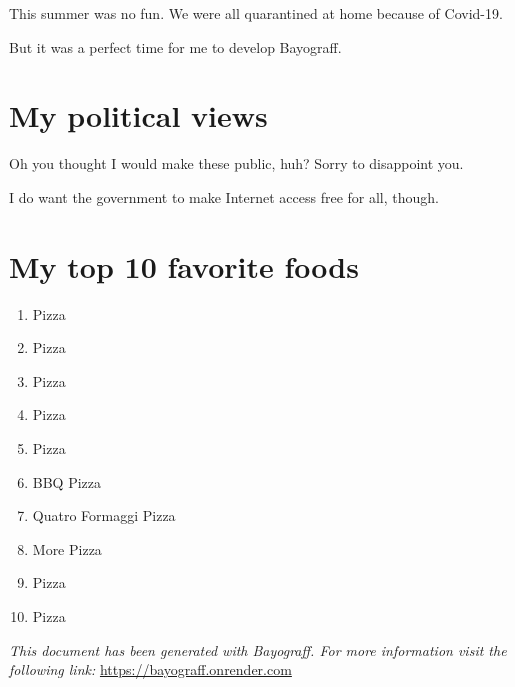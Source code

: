 \documentclass[12pt, a4paper]{article}
\begin{document}
This summer was no fun. We were all quarantined at home because of Covid-19.

But it was a perfect time for me to develop Bayograff.

\appendix

\section{My political views}

Oh you thought I would make these public, huh? Sorry to disappoint you.

I do want the government to make Internet access free for all, though.

\section{My top 10 favorite foods}

\begin{enumerate}
\item Pizza

\item Pizza

\item Pizza

\item Pizza

\item Pizza

\item BBQ Pizza

\item Quatro Formaggi Pizza

\item More Pizza

\item Pizza

\item Pizza

\end{enumerate}

\newpage
\textit{This document has been generated with Bayograff. For more information visit the following link:} 
\url{https://bayograff.onrender.com}
\end{document}
